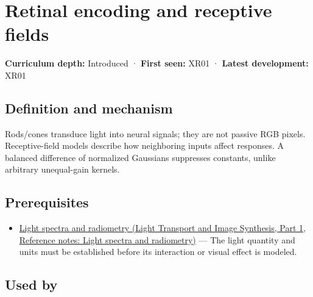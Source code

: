 \hypertarget{appendix-7281c15ac44a}{}\label{referencestart:appendix-7281c15ac44a}
\section{Retinal encoding and receptive fields}\label{appendix-7281c15ac44a-retinal-encoding-and-receptive-fields}

\hypertarget{appendix-7281c15ac44a-retinal-encoding-and-receptive-fields}{}

\textbf{Curriculum depth:} Introduced · \textbf{First seen:} XR01 · \textbf{Latest development:} XR01

\begin{allmightroledefinition}

\subsection{Definition and mechanism}\label{appendix-7281c15ac44a-definition-and-mechanism}

\hypertarget{appendix-7281c15ac44a-definition-and-mechanism}{}

Rods/cones transduce light into neural signals; they are not passive RGB pixels. Receptive-field models describe how neighboring inputs affect responses. A balanced difference of normalized Gaussians suppresses constants, unlike arbitrary unequal-gain kernels.

\end{allmightroledefinition}

\subsection{Prerequisites}\label{appendix-7281c15ac44a-prerequisites}

\hypertarget{appendix-7281c15ac44a-prerequisites}{}

\begin{itemize}
\tightlist
\item
  \href{../04-Light-Transport-and-Image-Synthesis-P01/main.pdf\#nameddest=appendix-215c2570199b}{Light spectra and radiometry (Light Transport and Image Synthesis, Part 1, Reference notes: Light spectra and radiometry)} --- The light quantity and units must be established before its interaction or visual effect is modeled.
\end{itemize}

\subsection{Used by}\label{appendix-7281c15ac44a-used-by}

